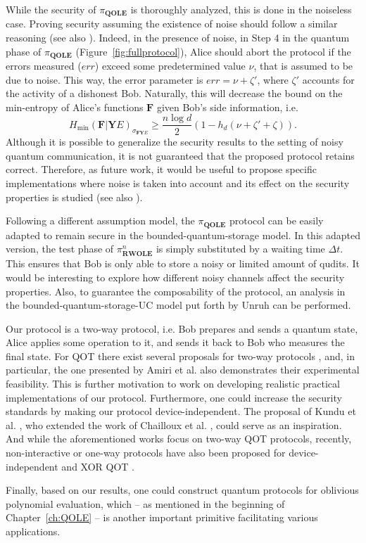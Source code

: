 While the security of $\pi_{\textbf{QOLE}}$ is thoroughly analyzed, this is done in the noiseless case. Proving security assuming the existence of noise should follow a similar reasoning (see also \cite{DFLSS09}). Indeed, in the presence of noise, in Step 4 in the quantum phase of $\pi_{\textbf{QOLE}}$ (Figure~\ref{fig:fullprotocol}), Alice should abort the protocol if the errors measured ($err$) exceed some predetermined value $\nu$, that is assumed to be due to noise. This way, the error parameter is $err = \nu + \zeta '$, where $\zeta '$ accounts for the activity of a dishonest Bob. Naturally, this will decrease the bound on the min-entropy of Alice's functions $\textbf{F}$ given Bob's side information, i.e.
$$H_{\min}(\mathbf{F} | \mathbf{Y} E)_{\sigma_{\mathbf{F}\mathbf{Y} E}} \geq \frac{n\log d}{2}\left(1 - h_d(\nu + \zeta ' + \zeta)\right).$$
Although it is possible to generalize the security results to the setting of noisy quantum communication, it is not guaranteed that the proposed protocol retains correct. Therefore, as future work, it would be useful to propose  specific implementations where noise is taken into account and its effect on the security properties is studied (see also \cite{BCDP21}).

Following a different assumption model, the $\pi_{\textbf{QOLE}}$ protocol can be easily adapted to remain secure in the bounded-quantum-storage model. In this adapted version, the test phase of $\pi^n_{\textbf{RWOLE}}$ is simply substituted by a waiting time $\Delta t$. This ensures that Bob is only able to store a noisy or limited amount of qudits. It would be interesting to explore how different noisy channels affect the security properties. Also, to guarantee the composability of the protocol, an analysis in the bounded-quantum-storage-UC model put forth by Unruh \cite{U11} can be performed.

Our protocol is a two-way protocol, i.e. Bob prepares and sends a quantum state, Alice applies some operation to it, and sends it back to Bob who measures the final state. For QOT there exist several proposals for two-way  protocols \cite{CZK18, ASRP21, KST21, CKS10, CGS16}, and, in particular, the one presented by Amiri et al. \cite{ASRP21} also demonstrates their experimental feasibility. This is further motivation to work on developing realistic practical implementations of our protocol. 
Furthermore, one could increase the security standards  by making our protocol device-independent. The proposal of Kundu et al. \cite{KST21}, who extended the work of Chailloux et al. \cite{CKS10}, could serve as an inspiration. And while the aforementioned works focus on two-way QOT protocols,  recently, non-interactive  or one-way protocols have also been proposed for device-independent \cite{BY21} and XOR QOT  \cite{SSH+21}.

Finally, based on our results, one could construct quantum protocols for oblivious polynomial evaluation, which -- as mentioned in the beginning of Chapter~\ref{ch:QOLE} -- is another important primitive facilitating various applications.

%
%
%
